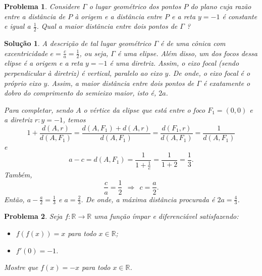 \documentclass{hipatia}
\newtheorem{problem*}{Problema}
\newtheorem*{solution*}{Solução}
\begin{document}
\begin{problem*}
Considere $\Gamma$ o lugar geométrico dos pontos $P$ do plano cuja razão entre a distância de $P$ à origem e a distância entre $P$ e a reta $y=-1$ é constante e igual a $\frac{1}{2}$. Qual a maior distância entre dois pontos de $\Gamma$ ? 
	
\end{problem*}

\begin{solution*}

A descrição de tal lugar geométrico $\Gamma$ é de uma cônica com excentricidade $e = \frac{c}{a} = \frac{1}{2}$, ou seja, $\Gamma$ é uma elipse. Além disso, um dos focos dessa elipse é a origem e a reta $y = -1$ é uma diretriz. Assim, o eixo focal (sendo perpendicular à diretriz) é vertical, paralelo ao eixo $y$. De onde, o eixo focal é o próprio eixo $y$. Assim, a maior distância entre dois pontos de $\Gamma$ é exatamente o dobro do comprimento do semieixo maior, isto é, $2a$.

\vspace{0.3cm}

Para completar, sendo $A$ o vértice da elipse que 
está entre o foco $F_1 = (0,0)$ e a diretriz $r : y=-1$, 
temos $$1 + \frac{ d(A,r)}{d(A,F_1)} = \frac{d(A,F_1) + d(A,r)}{d(A,F_1)} = \frac{d(F_1,r)}{d(A,F_1)} = \frac{1}{d(A,F_1)}$$ 
e
$$a - c = d(A,F_1) = \frac{1}{1 + \frac{1}{e}} = \frac{1}{1+2} = \frac{1}{3}.$$ Também, $$\frac{c}{a} = \frac{1}{2} \ \ \Rightarrow \ \ c = \frac{a}{2}.$$ 
Então, $a - \frac{a}{2} = \frac{1}{3}$ e $a = \frac{2}{3}$. De onde, a máxima distância procurada é $2a = \frac{4}{3}$.

\end{solution*}


\begin{problem*}
Seja $f : \mathbb{R} \rightarrow \mathbb{R}$ uma função ímpar e diferenciável satisfazendo:

\begin{itemize}
    \item $f(f(x)) = x$ para todo $x \in \mathbb{R}$;
    \item $f'(0) = -1$.
\end{itemize}

\noindent Mostre que $f(x) = -x$ para todo $x \in \mathbb{R}$.
	
\end{problem*}
\end{document}
